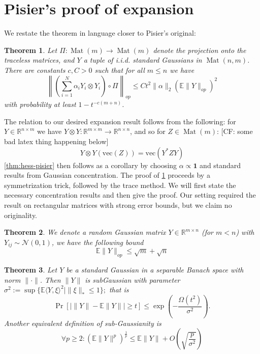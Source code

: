 \documentclass{article}
\newtheorem{theorem}{Theorem}
\newcommand{\R}{{\mathbb{R}}}
\newcommand{\mat}{\operatorname{Mat}}
\renewcommand{\vec}{\bm}
\newcommand{\E}{\mathbb{E}}
\newcommand{\CF}[1]{{\color{purple}[CF: #1]}}
\begin{document}
\section{Pisier's proof of expansion}\label{sec:pisier}
We restate the theorem in language closer to Pisier's original:

\begin{theorem} \label{thm:Pisier-expansion}
Let $\Pi: \mat(m) \to \mat(m)$ denote the projection onto the traceless matrices, and $Y$ a tuple of i.i.d. standard Gaussians in $\mat(n,m)$. There are constants $c,C > 0$ such that for all $m \leq n$ we have 
\[ \left\| \left(\sum_{i=1}^{N} \alpha_{i} Y_{i} \otimes Y_{i}\right) \circ \Pi \right\|_{op} \leq C t^{2} \|\alpha\|_{2} \left( \E \|Y\|_{op} \right)^{2} \]
with probability at least $ 1- t^{-c(m+n)}$. 
\end{theorem}

The relation to our desired expansion result follows from the following: for $Y \in \R^{n \times m}$ we have $Y \otimes Y : \R^{m \times m} \to \R^{n \times n}$, and so for $Z \in \mat(m)$:  \CF{some bad latex thing happening below}
\[ Y \otimes Y (\text{vec}(Z)) = \text{vec}( Y^{*} Z Y)      \]
\cref{thm:hess-pisier} then follows as a corollary by choosing $\alpha \propto \vec{1}$ and standard results from Gaussian concentration. The proof of \cref{thm:Pisier-expansion} proceeds by a symmetrization trick, followed by the trace method. We will first state the necessary concentration results and then give the proof. Our setting required the result on rectangular matrices with strong error bounds, but we claim no originality.  

\begin{theorem} \cite{P86}
We denote a random Gaussian matrix $Y \in \R^{m \times n}$ (for $m < n$) with $Y_{ij} \sim \mathcal{N}(0,1)$, we have the following bound
\[ \E \|Y\|_{op} \leq \sqrt{m} + \sqrt{n} \]
\end{theorem}


\begin{theorem} \cite{P86}
Let $Y$ be a standard Gaussian in a separable Banach space with norm $\|\cdot\|$. Then $\|Y\|$ is subGaussian with parameter $\sigma^{2} := \sup \{ \E \langle Y, \xi \rangle^{2} \mid \|\xi\|_{*} \leq 1 \}; $ that is
\[ \Pr [ | \|Y\| - \E \|Y\| | \geq t ] \leq \exp \left( - \frac{\Omega(t^{2})}{\sigma^{2}} \right).   \]
Another equivalent definition of sub-Gaussianity is
\[ \forall p \geq 2: (\E \|Y\|^{p})^{\frac{1}{p}} \leq \E \|Y\| + O \left( \sqrt{\frac{p}{\sigma^{2}}} \right)   \]
\end{theorem}
\end{document}
